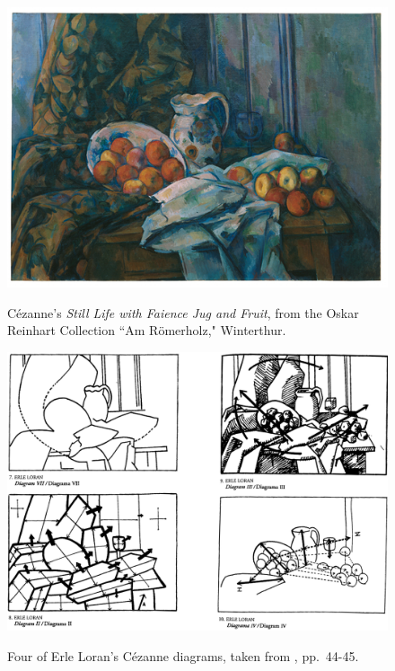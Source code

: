 \begin{figure}
	\centering
	\caption{C\'{e}zanne's \emph{Still Life with Faience Jug and Fruit}, from the Oskar Reinhart Collection ``Am R\"{o}merholz," Winterthur.}
	\includegraphics[width=6in]{cezanne.png}
	\label{cezanne}
\end{figure}

\begin{figure}
	\centering
	\caption{Four of Erle Loran's C\'{e}zanne diagrams, taken from \cite{wollheim1995}, pp.\ 44-45.}
	\includegraphics[width=6in]{loran_diagrams.png}
	\label{loran_diagrams}
\end{figure}

